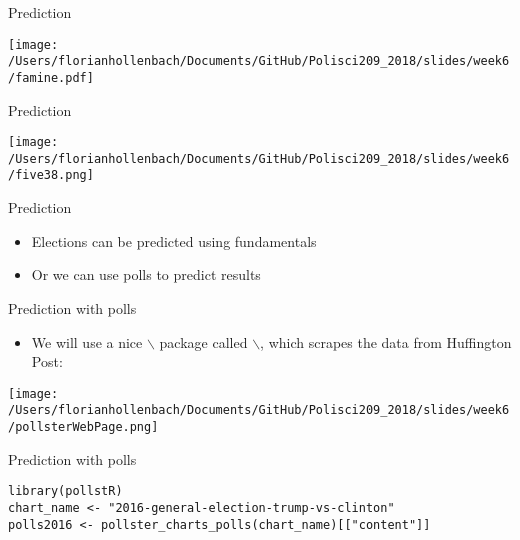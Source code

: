 \documentclass[presentation]{beamer}
\begin{document}
\begin{frame}[label={sec:org612c808}]{Prediction}
\begin{center}
\texttt{[image: /Users/florianhollenbach/Documents/GitHub/Polisci209\_2018/slides/week6/famine.pdf]}
\end{center}
\end{frame}



\begin{frame}[label={sec:org23184f1}]{Prediction}
\begin{center}
\texttt{[image: /Users/florianhollenbach/Documents/GitHub/Polisci209\_2018/slides/week6/five38.png]}
\end{center}
\end{frame}





\begin{frame}[label={sec:org92ee8f9}]{Prediction}
\begin{itemize}
\item Elections can be predicted using fundamentals
\end{itemize}

\pause

\begin{itemize}
\item Or we can use polls to predict results
\end{itemize}
\end{frame}


\begin{frame}[label={sec:org8501455}]{Prediction with polls}
\begin{itemize}
\item We will use a nice \R$\backslash$ package called \pollstR$\backslash$, which
scrapes the data from Huffington Post:
\end{itemize}

\begin{center}
\texttt{[image: /Users/florianhollenbach/Documents/GitHub/Polisci209\_2018/slides/week6/pollsterWebPage.png]}
\end{center}
\end{frame}

\begin{frame}[fragile,shrink=15,label={sec:orge1bc848}]{Prediction with polls}
 \begin{verbatim}
library(pollstR)
chart_name <- "2016-general-election-trump-vs-clinton"
polls2016 <- pollster_charts_polls(chart_name)[["content"]]
\end{verbatim}
\end{frame}
\end{document}

